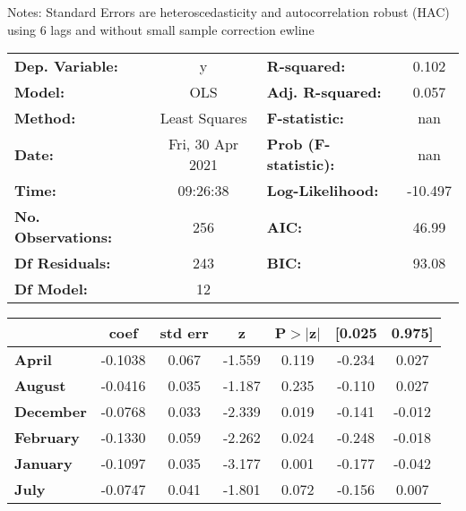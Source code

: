 Notes: \newline
 [1] Standard Errors are heteroscedasticity and autocorrelation robust (HAC) using 6 lags and without small sample correction
ewline\begin{center}
\begin{tabular}{lclc}
\toprule
\textbf{Dep. Variable:}    &        y         & \textbf{  R-squared:         } &     0.102   \\
\textbf{Model:}            &       OLS        & \textbf{  Adj. R-squared:    } &     0.057   \\
\textbf{Method:}           &  Least Squares   & \textbf{  F-statistic:       } &       nan   \\
\textbf{Date:}             & Fri, 30 Apr 2021 & \textbf{  Prob (F-statistic):} &      nan    \\
\textbf{Time:}             &     09:26:38     & \textbf{  Log-Likelihood:    } &   -10.497   \\
\textbf{No. Observations:} &         256      & \textbf{  AIC:               } &     46.99   \\
\textbf{Df Residuals:}     &         243      & \textbf{  BIC:               } &     93.08   \\
\textbf{Df Model:}         &          12      & \textbf{                     } &             \\
\bottomrule
\end{tabular}
\begin{tabular}{lcccccc}
                   & \textbf{coef} & \textbf{std err} & \textbf{z} & \textbf{P$> |$z$|$} & \textbf{[0.025} & \textbf{0.975]}  \\
\midrule
\textbf{April}     &      -0.1038  &        0.067     &    -1.559  &         0.119        &       -0.234    &        0.027     \\
\textbf{August}    &      -0.0416  &        0.035     &    -1.187  &         0.235        &       -0.110    &        0.027     \\
\textbf{December}  &      -0.0768  &        0.033     &    -2.339  &         0.019        &       -0.141    &       -0.012     \\
\textbf{February}  &      -0.1330  &        0.059     &    -2.262  &         0.024        &       -0.248    &       -0.018     \\
\textbf{January}   &      -0.1097  &        0.035     &    -3.177  &         0.001        &       -0.177    &       -0.042     \\
\textbf{July}      &      -0.0747  &        0.041     &    -1.801  &         0.072        &       -0.156    &        0.007     \\

\end{tabular}
\end{center}
